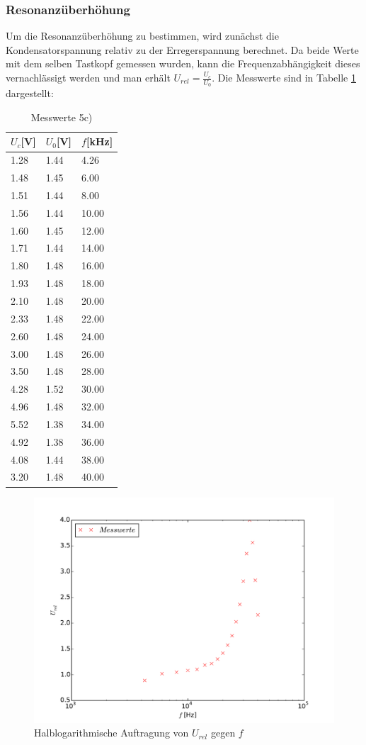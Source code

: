\subsubsection{Resonanzüberhöhung}
\label{sec:5c}
Um die Resonanzüberhöhung zu bestimmen, wird zunächst die Kondensatorspannung
relativ zu der Erregerspannung berechnet. Da beide Werte mit dem selben Tastkopf
gemessen wurden, kann die Frequenzabhängigkeit dieses vernachlässigt werden
und man erhält $U_{rel}=\frac{U_c}{U_0}$. Die Messwerte sind in
Tabelle \ref{tab:5b} dargestellt:
\begin{table}
\centering
\caption{Messwerte 5c)}
\label{tab:5b}
\begin{tabular}{lll}
\toprule
{$U_c$[V]} & {$U_0$[V]} &{$f$[kHz]}\\
\midrule
1.28 & 1.44 & 4.26 \\
1.48 & 1.45 & 6.00 \\
1.51 & 1.44 & 8.00 \\
1.56 & 1.44 & 10.00 \\
1.60 & 1.45 & 12.00 \\
1.71 & 1.44 & 14.00 \\
1.80 & 1.48 & 16.00 \\
1.93 & 1.48 & 18.00 \\
2.10 & 1.48 & 20.00 \\
2.33 & 1.48 & 22.00 \\
2.60 & 1.48 & 24.00 \\
3.00 & 1.48 & 26.00 \\
3.50 & 1.48 & 28.00 \\
4.28 & 1.52 & 30.00 \\
4.96 & 1.48 & 32.00 \\
5.52 & 1.38 & 34.00 \\
4.92 & 1.38 & 36.00 \\
4.08 & 1.44 & 38.00 \\
3.20 & 1.48 & 40.00 \\
\bottomrule
\end{tabular}
\end{table}
\begin{figure}
  \centering
  \includegraphics[width=\textwidth]{5c.pdf}
  \caption{Halblogarithmische Auftragung von $U_{rel}$ gegen $f$}
  \label{fig:5cergebnis}
\end{figure}
